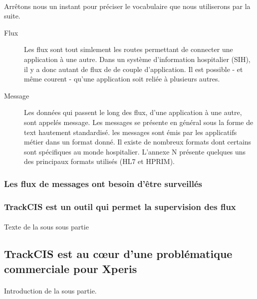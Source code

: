			\paragraph{}%
 			Arrêtons nous un instant pour préciser le vocabulaire que nous utiliserons
 			par la suite.\newline
 			\begin{description}
 				\item[Flux] Les flux sont tout simlement les routes permettant de connecter
 				une application à une autre. Dans un système d'information hospitalier
 				(SIH), il y a donc autant de flux de de couple d'application. Il est
 				possible - et même courent - qu'une application soit reliée à plusieurs
 				autres.
 				\item[Message] Les données qui passent le long des flux, d'une application
 				à une autre, sont appelés message. Les messages se présente en général sous
 				la forme de text hautement standardisé. les messages sont émis par les
 				applicatifs métier dans un format donné. Il existe de nombreux formats
 				dont certains sont spécifiques au monde hospitalier. L'annexe N présente
 				quelques uns des principaux formats utilisés (HL7 et HPRIM).
 			\end{description}
 			
		\subsubsection{Les flux de messages ont besoin d'être surveillés}
			\paragraph{}
			
			
			
		\subsubsection{TrackCIS est un outil qui permet la supervision des flux}
			\paragraph{}
			Texte de la sous sous partie
	
	\subsection{TrackCIS est au cœur d'une problématique commerciale pour Xperis}
		\paragraph{}
		Introduction de la sous partie.
		

